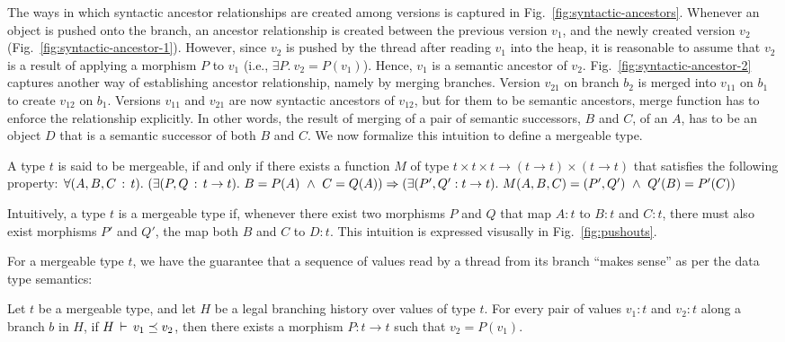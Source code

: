The ways in which syntactic ancestor relationships are created among
versions is captured in Fig.~\ref{fig:syntactic-ancestors}. Whenever an
object is pushed onto the branch, an ancestor relationship is created
between the previous version $v_1$, and the newly created version
$v_2$ (Fig.~\ref{fig:syntactic-ancestor-1}). However, since $v_2$ is
pushed by the thread after reading $v_1$ into the heap, it is
reasonable to assume that $v_2$ is a result of applying a morphism $P$
to $v_1$ (i.e., $\exists P.~v_2 = P(v_1)$).  Hence, $v_1$ is a
semantic ancestor of $v_2$.  Fig.~\ref{fig:syntactic-ancestor-2}
captures another way of establishing ancestor relationship, namely by
merging branches. Version $v_{21}$ on branch $b_2$ is merged into
$v_{11}$ on $b_1$ to create $v_{12}$ on $b_1$. Versions $v_{11}$ and
$v_{21}$ are now syntactic ancestors of $v_{12}$, but for them to be
semantic ancestors, merge function has to enforce the relationship
explicitly. In other words, the result of merging of a pair of
semantic successors, $B$ and $C$, of an $A$, has to be an object $D$
that is a semantic successor of both $B$ and $C$. We now formalize
this intuition to define a mergeable type.
\begin{definition} 
\label{def:mergeable-type}
A type $t$ is said to be mergeable, if and only if there exists a
function $M$ of type $t \times t \times t \rightarrow (t \rightarrow
t)\times(t \rightarrow t)$ that satisfies the following property:
$\forall (A, B, C\,:\,t).~ (\exists (P,Q\,:\, t \rightarrow t).~ B =
P(A) ~\wedge~ C = Q(A)) \Rightarrow (\exists (P',Q': t\rightarrow
t).~M(A,B,C) = (P',Q') ~\wedge~  Q'(B) = P'(C))$
\end{definition}
Intuitively, a type $t$ is a mergeable type if, whenever there exist
two morphisms $P$ and $Q$ that map $A:t$ to $B:t$ and $C:t$, there
must also exist morphisms $P'$ and $Q'$, the map both $B$ and $C$ to
$D:t$. This intuition is expressed visusally in
Fig.~\ref{fig:pushouts}.

For a mergeable type $t$, we have the guarantee that a sequence of
values read by a thread from its branch ``makes sense'' as per the
data type semantics: 

\begin{theorem} 
\label{thm:branch-consistency}
Let $t$ be a mergeable type, and let $H$ be a legal branching history
over values of type $t$. For every pair of values $v_1:t$ and $v_2:t$
along a branch $b$ in $H$, if $H\,\vdash\,v_1 \preceq v_2$, then there
exists a morphism $P:t\rightarrow t$ such that $v_2 = P(v_1)$.
\end{theorem}

